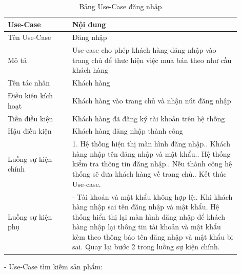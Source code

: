 \begin{longtable}[htp]{ |m{0.25\linewidth}|m{0.65\linewidth}|}
 \caption{Bảng Use-Case đăng nhập \label{long}}\\
 \hline
 Use-Case & Nội dung \\
 \hline
 Tên Use-Case & Đăng nhập \\
 \hline
 Mô tả & Use-case cho phép khách hàng đăng nhập vào trang chủ để thưc hiện việc mua bán theo như cầu khách hàng\\
 \hline
 Tên tác nhân & Khách hàng\\
 \hline
 Điều kiện kích hoạt & Khách hàng vào trang chủ và nhận nút đăng nhập\\
 \hline
 Tiền điều kiện & Khách hàng đã đăng ký tài khoản trên hệ thống\\
 \hline
 Hậu điều kiện & Khách hàng đăng nhập thành công\\
 \hline
 Luồng sự kiện chính & 
  1. Hệ thống hiện thị màn hình đăng nhập.\newline
  2. Khách hàng nhập tên đăng nhập và mật khẩu.\newline
  3. Hệ thống kiểm tra thông tin đăng nhập.\newline
  4. Nếu thành công hệ thống sẽ đưa khách hàng về trang chủ.\newline
  5. Kết thúc Use-case.	
 \\
 \hline
 Luồng sự kiện phụ & 
 - Tài khoản và mật khẩu không hợp lệ:\newline
 1. Khi khách hàng nhập sai tên đăng nhập và mật khẩu\newline
 2. Hệ thống hiển thị lại màn hình đăng nhập để khách hàng nhập lại thông tin tài khoản và mật khẩu kèm theo thông báo tên đăng nhập và mật khẩu bị sai.\newline
  Quay lại bước 2 trong luồng sự kiện chính.
 \\
 \hline
\end{longtable}
\par
- Use-Case tìm kiếm sản phẩm:
